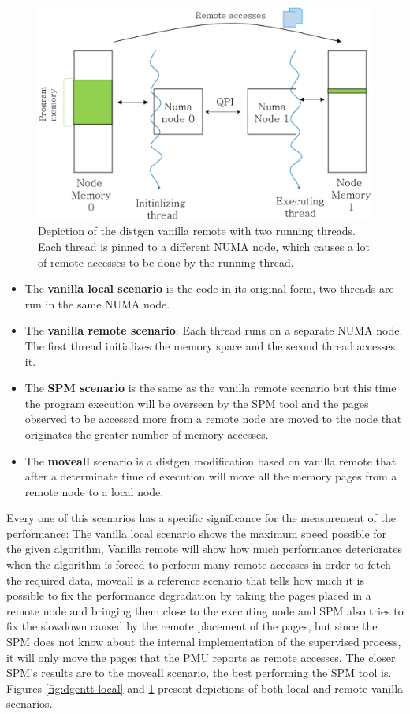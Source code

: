 \begin{figure}
	\centering
		\includegraphics[width=.8\textwidth]{figures/distgentt-remote.eps}
		\caption[Depiction of the working of the distgen vanilla remote scenario with two threads]{Depiction of the distgen vanilla remote with two running threads. Each thread is pinned to a different NUMA node, which causes a lot of remote accesses to be done by the running thread.}
		\label{fig:dgentt-remote}
\end{figure}

\begin{itemize}
	\item The \textbf{vanilla local scenario} is the code in its original form, two threads are run in the same NUMA node.
	\item The \textbf{vanilla remote scenario}: Each thread runs on a separate NUMA node. The first thread initializes the memory space and the second thread accesses it. 
	\item The \textbf{SPM scenario} is the same as the vanilla remote scenario but this time the program execution will be overseen by the SPM tool and the pages observed to be accessed more from a remote node are moved to the node that originates the greater number of memory accesses.
	\item The \textbf{moveall} scenario is a distgen modification based on vanilla remote that after a determinate time of execution will move all the memory pages from a remote node to a local node.
\end{itemize}

Every one of this scenarios has a specific significance for the measurement of the performance: The vanilla local scenario shows the maximum speed possible for the given algorithm, Vanilla remote will show how much performance deteriorates when the algorithm is forced to perform many remote accesses in order to fetch the required data, moveall is a reference scenario that tells how much it is possible to fix the performance degradation by taking the pages placed in a remote node and bringing them close to the executing node and SPM also tries to fix the slowdown caused by the remote placement of the pages, but since the SPM does not know about the internal implementation of the supervised process, it will only move the pages that the PMU reports as remote accesses. The closer SPM's results are to the moveall scenario, the best performing the SPM tool is. Figures \ref{fig:dgentt-local} and \ref{fig:dgentt-remote} present depictions of both local and remote vanilla scenarios.

